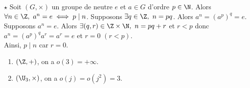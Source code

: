 \documentclass[11pt]{article}
\begin{document}
\vspace*{-0.8cm}

\begin{prop}{$\star$}{}
    Soit $(G,\times)$ un groupe de neutre $e$ et $a\in G$ d'ordre $p\in\N$. Alors $\forall n \in \Z, ~ a^n=e\iff p \mid n$.
    \tcblower
    \boxed{\la} Supposons $\exists q\in\Z, ~ n=pq$. Alors $a^n=(a^p)^q=e$.\\
    \boxed{\ra} Supposons $a^n=e$. Alors $\exists (q,r)\in\Z\times\N, ~ n=pq+r$ et $r<p$ donc $a^n=(a^p)^qa^r=a^r=e$ et $r=0$ $(r<p)$.\\
    Ainsi, $p\mid n$ car $r=0$.
\end{prop}

\vspace*{-0.8cm}

\begin{ex}{}{}
    \begin{enumerate}
        \item $(\Z,+)$, on a $o(3)=+\infty$.
        \item $(\U_3,\times)$, on a $o(j)=o(j^2)=3$.
    \end{enumerate}
\end{ex}

\vspace*{-0.7cm}
\end{document}
